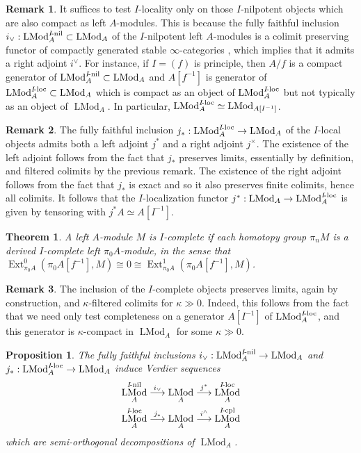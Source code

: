 \documentclass{article}
\newtheorem{theorem}{Theorem}[subsection]
\newtheorem{proposition}{Proposition}[subsection]
\theoremstyle{definition}
\newtheorem{remark}{Remark}[subsection]
\renewcommand{\i}{\infty}
\newcommand{\too}{\longrightarrow}
\DeclareMathOperator{\LMod}{LMod}
\DeclareMathOperator{\Ext}{Ext}
\DeclareMathOperator{\loc}{loc}
\DeclareMathOperator{\nil}{nil}
\begin{document}
\begin{remark}
It suffices to test $I$-locality only on those $I$-nilpotent objects which are also compact as left $A$-modules.
This is because the fully faithful inclusion $i_\lor:\LMod_A^{I\textrm{\!-\!}\nil}\subset\LMod_A$ of the $I$-nilpotent left $A$-modules is a colimit preserving functor of compactly generated stable $\i$-categories \cite[Proposition 7.1.1.12]{SAG}, which implies that it admits a right adjoint $i^\lor$.
For instance, if $I=(f)$ is principle, then $A/f$ is a compact generator of $\LMod_A^{I\textrm{\!-\!}\nil}\subset\LMod_A$ and $A[f^{-1}]$ is generator of $\LMod_A^{I\textrm{\!-\!}\loc}\subset\LMod_A$ which is compact as an object of $\LMod_A^{I\textrm{\!-\!}\loc}$ but not typically as an object of $\LMod_A$.
In particular, $\LMod_A^{I\textrm{\!-\!}\loc}\simeq\LMod_{A[I^{-1}]}$.
\end{remark}
\begin{remark}
The fully faithful inclusion  $j_*:\LMod_A^{I\textrm{\!-\!}\loc}\to\LMod_A$  of the $I$-local objects admits both a left adjoint $j^*$ and a right adjoint $j^\times$.
The existence of the left adjoint follows from the fact that $j_*$ preserves limits, essentially by definition, and filtered colimits by the previous remark.
The existence of the right adjoint follows from the fact that $j_*$ is exact and so it also preserves finite colimits, hence all colimits.
It follows that the $I$-localization functor $j^*:\LMod_A\to\LMod_A^{I\textrm{\!-\!}\loc}$ is given by tensoring with $j^*A\simeq A[I^{-1}]$.
\end{remark}
\begin{theorem}{\em \cite[Theorem 7.3.4.1]{SAG}}
A left $A$-module $M$ is $I$-complete if each homotopy group $\pi_n M$ is a derived $I$-complete left $\pi_0 A$-module, in the sense that $\Ext^0_{\pi_0 A}(\pi_0 A[f^{-1}],M)\cong 0\cong\Ext^1_{\pi_0 A}(\pi_0 A[f^{-1}],M)$.
\end{theorem}
\begin{remark}
The inclusion of the $I$-complete objects preserves limits, again by construction, and $\kappa$-filtered colimits for $\kappa\gg 0$.
Indeed, this follows from the fact that we need only test completeness on a generator $A[I^{-1}]$ of $\LMod_A^{I\textrm{\!-\!}\loc}$, and this generator is $\kappa$-compact in $\LMod_A$ for some $\kappa\gg 0$.
\end{remark}
\begin{proposition}{\em \cite[Proposition 7.2.4.4 and Proposition 7.3.1.4]{SAG}}
The fully faithful inclusions $i_\lor:\LMod_A^{I\textrm{\!-\!}\nil}\to\LMod_A$ and $j_*:\LMod_A^{I\textrm{\!-\!}\loc}\to\LMod_A$ induce Verdier sequences
\begin{gather*}
\LMod_A^{I\textrm{\!-\!}\nil}\overset{i_\lor}{\too}\LMod_A\overset{j^*}{\too}\LMod_A^{I\textrm{\!-\!}\loc}\\
\LMod_A^{I\textrm{\!-\!}\loc}\overset{j_*}{\too}\LMod_A\overset{i^\land}{\too}\LMod_A^{I\textrm{\!-}\mathrm{cpl}}
\end{gather*}
which are semi-orthogonal decompositions of $\LMod_A$.
\end{proposition}
\end{document}
